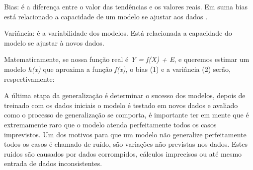 \begin{alineas}
	\item Bias: é a diferença entre o valor das tendências e os valores reais. Em suma bias está relacionado a capacidade de um modelo
				se ajustar aos dados .
	\item Variância: é a variabilidade dos modelos. Está relacionada a capacidade do modelo se ajustar à novos dados.  
\end{alineas}   

Matematicamente, se nossa função real é \textit{Y = f(X) + E}, e queremos estimar um modelo \textit{h(x)} que aproxima a função \textit{f(x)},
o bias (1) e a variância (2) serão, respectivamente:
\begin{figure}[ht!]
	\centering
\end{figure}

A última etapa da generalização é determinar o sucesso dos modelos, depois de treinado com os dados iniciais
o modelo é testado em novos dados e avaliado como o processo de generalização se comporta, é importante ter em mente que é extremamente raro
que o modelo atenda perfeitamente todos os casos imprevistos.
Um dos motivos para que um modelo não generalize perfeitamente todos os casos é chamado de ruído, são variações não previstas nos dados.
Estes ruidos são causados por dados corrompidos, cálculos imprecisos ou até mesmo entrada de dados inconsistentes.









 